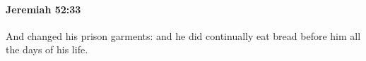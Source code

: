 
		\paragraph{Jeremiah 52:33} %
			\label{JEREMIAH-52-33}

			And changed his prison garments: and he did continually eat bread before him all the days of his life.


